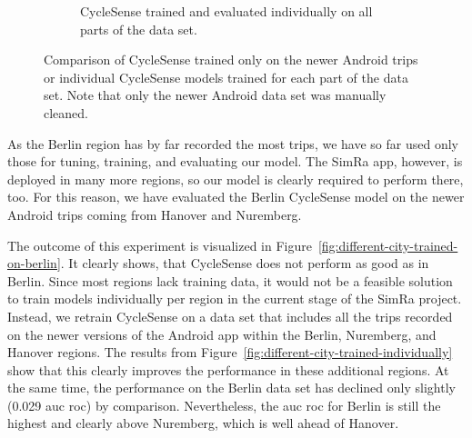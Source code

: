 \begin{figure}
\begin{subfigure}[b]{0.475\textwidth}
		\caption{\small CycleSense trained and evaluated individually on all parts of the data set. \newline}
		\label{fig:individually}
	\end{subfigure}
	\caption{Comparison of CycleSense trained only on the newer Android trips or individual CycleSense models trained for each part of the data set. Note that only the newer Android data set was manually cleaned.}
	\label{fig:comp-trainedonone-individually}
\end{figure}

As the Berlin region has by far recorded the most trips, we have so far used only those for tuning, training, and evaluating our model.
The SimRa app, however, is deployed in many more regions, so our model is clearly required to perform there, too.
For this reason, we have evaluated the Berlin CycleSense model on the newer Android trips coming from Hanover and Nuremberg.

\newpage
The outcome of this experiment is visualized in Figure~\ref{fig:different-city-trained-on-berlin}.
It clearly shows, that CycleSense does not perform as good as in Berlin.
Since most regions lack training data, it would not be a feasible solution to train models individually per region in the current stage of the SimRa project.
Instead, we retrain CycleSense on a data set that includes all the trips recorded on the newer versions of the Android app within the Berlin, Nuremberg, and Hanover regions.
The results from Figure~\ref{fig:different-city-trained-individually} show that this clearly improves the performance in these additional regions.
At the same time, the performance on the Berlin data set has declined only slightly (0.029 \ac{auc} \ac{roc}) by comparison.
Nevertheless, the \ac{auc} \ac{roc} for Berlin is still the highest and clearly above Nuremberg, which is well ahead of Hanover.

